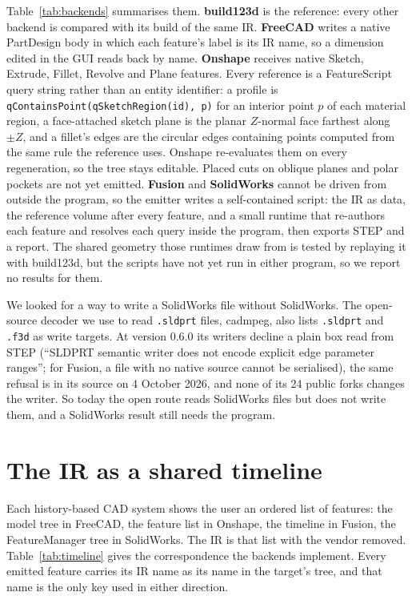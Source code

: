 \documentclass[11pt]{article}
\newcommand{\code}[1]{\texttt{\small #1}}
\begin{document}
Table~\ref{tab:backends} summarises them. \textbf{build123d} is the reference:
every other backend is compared with its build of the same IR. \textbf{FreeCAD}
writes a native PartDesign body in which each feature's label is its IR name, so
a dimension edited in the GUI reads back by name. \textbf{Onshape} receives
native Sketch, Extrude, Fillet, Revolve and Plane features. Every reference is
a FeatureScript query string rather than an entity identifier: a profile is
\code{qContainsPoint(qSketchRegion(id), p)} for an interior point $p$ of each
material region, a face-attached sketch plane is the planar $Z$-normal face
farthest along $\pm Z$, and a fillet's edges are the circular edges containing
points computed from the same rule the reference uses. Onshape re-evaluates them
on every regeneration, so the tree stays editable. Placed cuts on oblique planes
and polar pockets are not yet emitted. \textbf{Fusion} and \textbf{SolidWorks}
cannot be driven from outside the program, so the emitter writes a
self-contained script: the IR as data, the reference volume after every
feature, and a small runtime that re-authors each feature and resolves each
query inside the program, then exports STEP and a report. The shared geometry
those runtimes draw from is tested by replaying it with build123d, but the
scripts have not yet run in either program, so we report no results for them.

We looked for a way to write a SolidWorks file without SolidWorks. The
open-source decoder we use to read \code{.sldprt} files, cadmpeg, also lists
\code{.sldprt} and \code{.f3d} as write targets. At version 0.6.0 its writers
decline a plain box read from STEP (``SLDPRT semantic writer does not encode
explicit edge parameter ranges''; for Fusion, a file with no native source
cannot be serialised), the same refusal is in its source on 4 October 2026, and
none of its 24 public forks changes the writer. So today the open route reads
SolidWorks files but does not write them, and a SolidWorks result still needs
the program.

\section{The IR as a shared timeline}\label{sec:timeline}

Each history-based CAD system shows the user an ordered list of features: the
model tree in FreeCAD, the feature list in Onshape, the timeline in Fusion, the
FeatureManager tree in SolidWorks. The IR is that list with the vendor removed.
Table~\ref{tab:timeline} gives the correspondence the backends implement. Every
emitted feature carries its IR name as its name in the target's tree, and that
name is the only key used in either direction.
\end{document}
